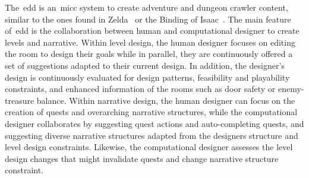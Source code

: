 The~\acrshort{edd} is an~\acrshort{micc} system to create adventure and dungeon crawler content, similar to the ones found in Zelda~\cite{tloz} or the Binding of Isaac~\cite{bindingISAAC}. The main feature of~\acrshort{edd} is the collaboration between human and computational designer to create levels and narrative. Within level design, the human designer focuses on editing the room to design their goals while in parallel, they are continuously offered a set of suggestions adapted to their current design. In addition, the designer's design is continuously evaluated for design patterns, feasibility and playability constraints, and enhanced information of the rooms such as door safety or enemy-treasure balance. Within narrative design, the human designer can focus on the creation of quests and overarching narrative structures, while the computational designer collaborates by suggesting quest actions and auto-completing quests, and suggesting diverse narrative structures adapted from the designers structure and level design constraints. Likewise, the computational designer assesses the level design changes that might invalidate quests and change narrative structure constraint.


